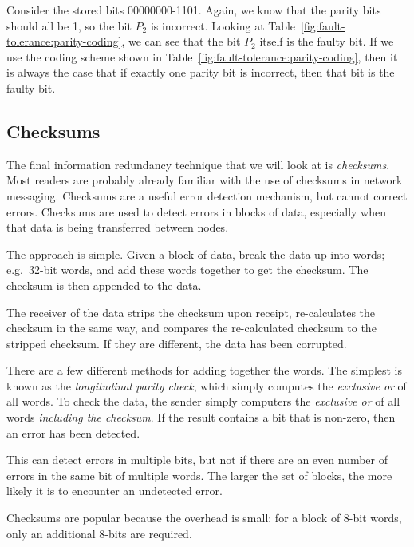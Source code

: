 \begin{example}
Consider the stored bits 00000000-1101. Again, we know that the parity bits should all be 1, so the bit $P_2$ is incorrect. Looking at  Table~\ref{fig:fault-tolerance:parity-coding}, we can see that the bit $P_2$ itself is the faulty bit. If we use the coding scheme shown in Table~\ref{fig:fault-tolerance:parity-coding}, then it is always the case that if exactly one parity bit is incorrect, then that bit is the faulty bit.

\end{example}

\subsection{Checksums}

The final information redundancy technique that we will look at is \emph{checksums}. Most readers are probably already familiar with the use of checksums in network messaging. Checksums are a useful error detection mechanism, but cannot correct errors.  Checksums are used to detect errors in blocks of data, especially when that data is being transferred between nodes.

The approach is simple. Given a block of data, break the data up into words; e.g.\ 32-bit words, and add these words together to get the checksum. The checksum is then appended to the data.

The receiver of the data strips the checksum upon receipt, re-calculates the checksum in the same way, and compares the re-calculated checksum to the stripped checksum. If they are different, the data has been corrupted.

There are a few different methods for adding together the words. The simplest is known as the \emph{longitudinal parity check}, which simply computes the \emph{exclusive or} of all words. To check the data, the sender simply computers the \emph{exclusive or} of all words \emph{including the checksum}. If the result contains a bit that is non-zero, then an error has been detected.

This can detect errors in multiple bits, but not if there are an even number of errors in the same bit of multiple words. The larger the set of blocks, the more likely it is to encounter an undetected error.

Checksums are popular because the overhead is small: for a block of 8-bit words, only an additional 8-bits are required. 



